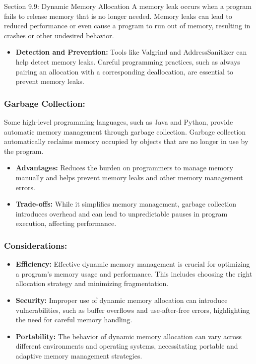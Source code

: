 \begin{notes}{Section 9.9: Dynamic Memory Allocation}
    A memory leak occurs when a program fails to release memory that is no longer needed. Memory leaks can lead to reduced performance or even cause a program to run out of memory, resulting in crashes 
    or other undesired behavior.
    
    \begin{itemize}
        \item \textbf{Detection and Prevention:} Tools like Valgrind and AddressSanitizer can help detect memory leaks. Careful programming practices, such as always pairing an allocation with a 
        corresponding deallocation, are essential to prevent memory leaks.
    \end{itemize}
    
    \subsubsection*{Garbage Collection:}
    
    Some high-level programming languages, such as Java and Python, provide automatic memory management through garbage collection. Garbage collection automatically reclaims memory occupied by objects 
    that are no longer in use by the program.
    
    \begin{itemize}
        \item \textbf{Advantages:} Reduces the burden on programmers to manage memory manually and helps prevent memory leaks and other memory management errors.
        \item \textbf{Trade-offs:} While it simplifies memory management, garbage collection introduces overhead and can lead to unpredictable pauses in program execution, affecting performance.
    \end{itemize}
    
    \subsubsection*{Considerations:}
    
    \begin{itemize}
        \item \textbf{Efficiency:} Effective dynamic memory management is crucial for optimizing a program's memory usage and performance. This includes choosing the right allocation strategy and 
        minimizing fragmentation.
        \item \textbf{Security:} Improper use of dynamic memory allocation can introduce vulnerabilities, such as buffer overflows and use-after-free errors, highlighting the need for careful memory handling.
        \item \textbf{Portability:} The behavior of dynamic memory allocation can vary across different environments and operating systems, necessitating portable and adaptive memory management strategies.
    \end{itemize}
\end{notes}

